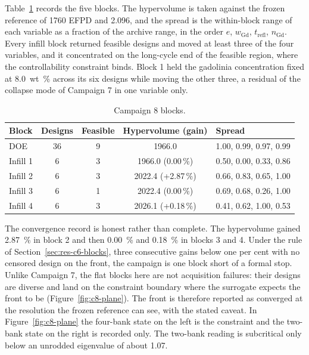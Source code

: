 Table~\ref{tab:c8-blocks} records the five blocks. The hypervolume is
taken against the frozen reference of 1760 EFPD and 2.096, and the
spread is the within-block range of each variable as a fraction of the
archive range, in the order $e$, $w_\mathrm{Gd}$, $t_\mathrm{refl}$,
$n_\mathrm{Gd}$. Every infill block returned feasible designs and moved
at least three of the four variables, and it concentrated on the
long-cycle end of the feasible region, where the controllability constraint binds.
Block 1 held the gadolinia concentration fixed at \SI{8.0}{wt\%} across
its six designs while moving the other three, a residual of the
collapse mode of Campaign 7 in one variable only.

\begin{table}[htbp]
  \centering
  \caption{Campaign 8 blocks.}
  \label{tab:c8-blocks}
  \begin{tabular}{lcccl}
    \toprule
    Block & Designs & Feasible & Hypervolume (gain) & Spread \\
    \midrule
    DOE      & 36 & 9 & 1966.0 & 1.00, 0.99, 0.97, 0.99 \\
    Infill 1 &  6 & 3 & 1966.0 (0.00\,\%) & 0.50, 0.00, 0.33, 0.86 \\
    Infill 2 &  6 & 3 & 2022.4 (+2.87\,\%) & 0.66, 0.83, 0.65, 1.00 \\
    Infill 3 &  6 & 1 & 2022.4 (0.00\,\%) & 0.69, 0.68, 0.26, 1.00 \\
    Infill 4 &  6 & 3 & 2026.1 (+0.18\,\%) & 0.41, 0.62, 1.00, 0.53 \\
    \bottomrule
  \end{tabular}
\end{table}

The convergence record is honest rather than complete. The hypervolume
gained \SI{2.87}{\%} in block 2 and then \SI{0.00}{\%} and
\SI{0.18}{\%} in blocks 3 and 4. Under the rule of
Section~\ref{sec:res-c6-blocks}, three consecutive gains below one per
cent with no censored design on the front, the campaign is one block
short of a formal stop. Unlike Campaign 7, the flat blocks here are not
acquisition failures: their designs are diverse and land on the
constraint boundary where the surrogate expects the front to be
(Figure~\ref{fig:c8-plane}). The front is therefore reported as
converged at the resolution the frozen reference can see, with the
stated caveat. In Figure~\ref{fig:c8-plane} the four-bank state on the
left is the constraint and the two-bank state on the right is recorded
only. The two-bank reading is subcritical only below an unrodded
eigenvalue of about 1.07.

